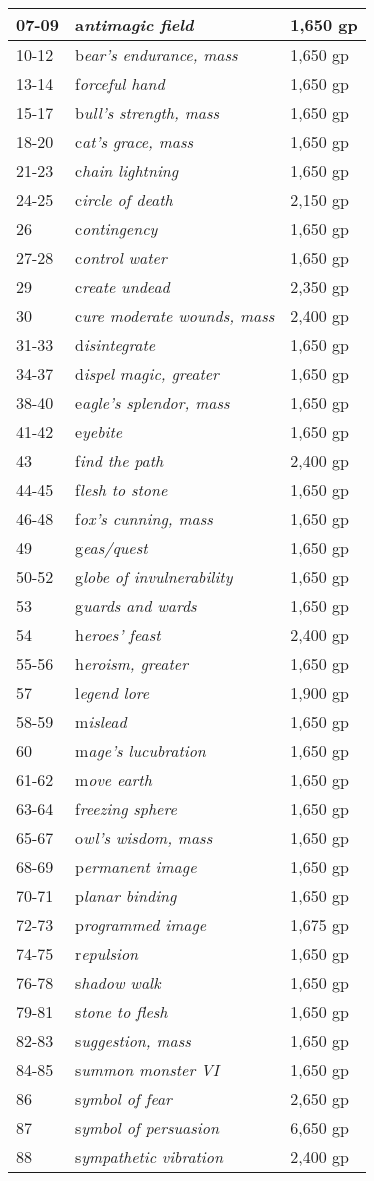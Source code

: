 \documentclass{article}
\begin{document}
\begin{tabular}{|>{\raggedright}p{28pt}|>{\raggedright}p{200pt}|>{\raggedright}p{85pt}|}
\hline
07-09 & a\textit{ntimagic field} & 1,650 gp\tabularnewline
\hline
10-12 & b\textit{ear's endurance, mass} & 1,650 gp\tabularnewline
\hline
13-14 & f\textit{orceful hand} & 1,650 gp\tabularnewline
\hline
15-17 & b\textit{ull's strength, mass} & 1,650 gp\tabularnewline
\hline
18-20 & c\textit{at's grace, mass} & 1,650 gp\tabularnewline
\hline
21-23 & c\textit{hain lightning} & 1,650 gp\tabularnewline
\hline
24-25 & c\textit{ircle of death} & 2,150 gp\tabularnewline
\hline
26 & c\textit{ontingency} & 1,650 gp\tabularnewline
\hline
27-28 & c\textit{ontrol water} & 1,650 gp\tabularnewline
\hline
29 & c\textit{reate undead} & 2,350 gp\tabularnewline
\hline
30 & c\textit{ure moderate wounds, mass} & 2,400 gp\tabularnewline
\hline
31-33 & d\textit{isintegrate} & 1,650 gp\tabularnewline
\hline
34-37 & d\textit{ispel magic, greater} & 1,650 gp\tabularnewline
\hline
38-40 & e\textit{agle's splendor, mass} & 1,650 gp\tabularnewline
\hline
41-42 & e\textit{yebite} & 1,650 gp\tabularnewline
\hline
43 & f\textit{ind the path} & 2,400 gp\tabularnewline
\hline
44-45 & f\textit{lesh to stone} & 1,650 gp\tabularnewline
\hline
46-48 & f\textit{ox's cunning, mass} & 1,650 gp\tabularnewline
\hline
49 & g\textit{eas/quest} & 1,650 gp\tabularnewline
\hline
50-52 & g\textit{lobe of invulnerability} & 1,650 gp\tabularnewline
\hline
53 & g\textit{uards and wards} & 1,650 gp\tabularnewline
\hline
54 & h\textit{eroes' feast} & 2,400 gp\tabularnewline
\hline
55-56 & h\textit{eroism, greater} & 1,650 gp\tabularnewline
\hline
57 & l\textit{egend lore} & 1,900 gp\tabularnewline
\hline
58-59 & m\textit{islead} & 1,650 gp\tabularnewline
\hline
60 & m\textit{age's lucubration} & 1,650 gp\tabularnewline
\hline
61-62 & m\textit{ove earth} & 1,650 gp\tabularnewline
\hline
63-64 & f\textit{reezing sphere} & 1,650 gp\tabularnewline
\hline
65-67 & o\textit{wl's wisdom, mass} & 1,650 gp\tabularnewline
\hline
68-69 & p\textit{ermanent image} & 1,650 gp\tabularnewline
\hline
70-71 & p\textit{lanar binding} & 1,650 gp\tabularnewline
\hline
72-73 & p\textit{rogrammed image} & 1,675 gp\tabularnewline
\hline
74-75 & r\textit{epulsion} & 1,650 gp\tabularnewline
\hline
76-78 & s\textit{hadow walk} & 1,650 gp\tabularnewline
\hline
79-81 & s\textit{tone to flesh} & 1,650 gp\tabularnewline
\hline
82-83 & s\textit{uggestion, mass} & 1,650 gp\tabularnewline
\hline
84-85 & s\textit{ummon monster VI} & 1,650 gp\tabularnewline
\hline
86 & s\textit{ymbol of fear} & 2,650 gp\tabularnewline
\hline
87 & s\textit{ymbol of persuasion} & 6,650 gp\tabularnewline
\hline
88 & s\textit{ympathetic vibration} & 2,400 gp\tabularnewline

\end{tabular}
\end{document}
